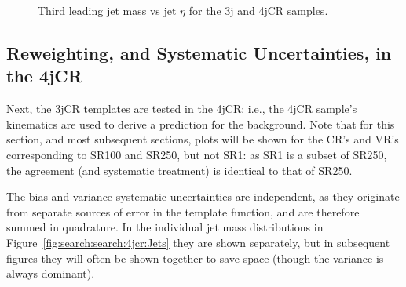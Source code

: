 \begin{figure}[!ht]
  \centering
  

    
  \caption{Third leading jet mass vs jet $\eta$ for the 3j and 4jCR samples.}
           
  \label{fig:search:search:kincorrelations:meta2}
\end{figure}

















\subsection{Reweighting, and Systematic Uncertainties, in the 4jCR}

Next, the 3jCR templates are tested in the 4jCR: i.e., the 4jCR sample's kinematics are used to derive a prediction for the \MJ background. Note that for this section, and most subsequent sections, plots will be shown for the CR's and VR's corresponding to SR100 and SR250, but not SR1: as SR1 is a subset of SR250, the agreement (and systematic treatment) is identical to that of SR250.

The bias and variance systematic uncertainties are independent, as they originate from separate sources of error in the template function, and are therefore summed in quadrature. In the individual jet mass distributions in Figure~\ref{fig:search:search:4jcr:Jets} they are shown separately, but in subsequent figures they will often be shown together to save space (though the variance is always dominant).


